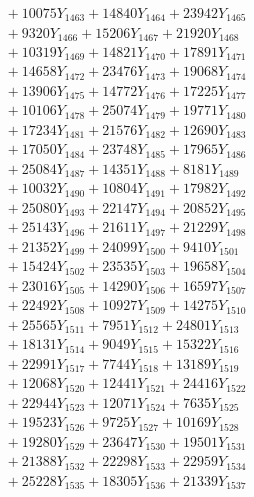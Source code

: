 \documentclass[a4paper,10pt]{article}
\begin{document}
{\begin{align}
&\;  + 10075 Y_{1463} + 14840 Y_{1464} + 23942 Y_{1465} \\[0.3ex]
&\;  + 9320 Y_{1466} + 15206 Y_{1467} + 21920 Y_{1468} \\[0.5ex]\allowbreak
&\;  + 10319 Y_{1469} + 14821 Y_{1470} + 17891 Y_{1471} \\[0.3ex]
&\;  + 14658 Y_{1472} + 23476 Y_{1473} + 19068 Y_{1474} \\[0.3ex]
&\;  + 13906 Y_{1475} + 14772 Y_{1476} + 17225 Y_{1477} \\[0.3ex]
&\;  + 10106 Y_{1478} + 25074 Y_{1479} + 19771 Y_{1480} \\[0.3ex]
&\;  + 17234 Y_{1481} + 21576 Y_{1482} + 12690 Y_{1483} \\[0.3ex]
&\;  + 17050 Y_{1484} + 23748 Y_{1485} + 17965 Y_{1486} \\[0.3ex]
&\;  + 25084 Y_{1487} + 14351 Y_{1488} + 8181 Y_{1489} \\[0.3ex]
&\;  + 10032 Y_{1490} + 10804 Y_{1491} + 17982 Y_{1492} \\[0.3ex]
&\;  + 25080 Y_{1493} + 22147 Y_{1494} + 20852 Y_{1495} \\[0.3ex]
&\;  + 25143 Y_{1496} + 21611 Y_{1497} + 21229 Y_{1498} \\[0.5ex]\allowbreak
&\;  + 21352 Y_{1499} + 24099 Y_{1500} + 9410 Y_{1501} \\[0.3ex]
&\;  + 15424 Y_{1502} + 23535 Y_{1503} + 19658 Y_{1504} \\[0.3ex]
&\;  + 23016 Y_{1505} + 14290 Y_{1506} + 16597 Y_{1507} \\[0.3ex]
&\;  + 22492 Y_{1508} + 10927 Y_{1509} + 14275 Y_{1510} \\[0.3ex]
&\;  + 25565 Y_{1511} + 7951 Y_{1512} + 24801 Y_{1513} \\[0.3ex]
&\;  + 18131 Y_{1514} + 9049 Y_{1515} + 15322 Y_{1516} \\[0.3ex]
&\;  + 22991 Y_{1517} + 7744 Y_{1518} + 13189 Y_{1519} \\[0.3ex]
&\;  + 12068 Y_{1520} + 12441 Y_{1521} + 24416 Y_{1522} \\[0.3ex]
&\;  + 22944 Y_{1523} + 12071 Y_{1524} + 7635 Y_{1525} \\[0.3ex]
&\;  + 19523 Y_{1526} + 9725 Y_{1527} + 10169 Y_{1528} \\[0.5ex]\allowbreak
&\;  + 19280 Y_{1529} + 23647 Y_{1530} + 19501 Y_{1531} \\[0.3ex]
&\;  + 21388 Y_{1532} + 22298 Y_{1533} + 22959 Y_{1534} \\[0.3ex]
&\;  + 25228 Y_{1535} + 18305 Y_{1536} + 21339 Y_{1537} \\[0.3ex]

\end{align}}
\end{document}
